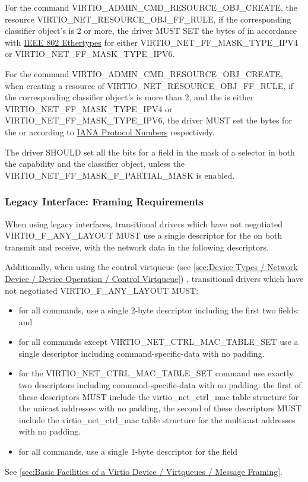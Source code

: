 For the command VIRTIO_ADMIN_CMD_RESOURCE_OBJ_CREATE, the resource 
VIRTIO_NET_RESOURCE_OBJ_FF_RULE, if the corresponding classifier object's
 is 2 or more, the driver MUST SET the  bytes of
 in accordance with
\hyperref[intro:IEEE 802 Ethertypes]{IEEE 802 Ethertypes}
for either VIRTIO_NET_FF_MASK_TYPE_IPV4 or VIRTIO_NET_FF_MASK_TYPE_IPV6.

For the command VIRTIO_ADMIN_CMD_RESOURCE_OBJ_CREATE, when creating a resource of
 VIRTIO_NET_RESOURCE_OBJ_FF_RULE, if the corresponding classifier
object's  is more than 2, and the  is either
VIRTIO_NET_FF_MASK_TYPE_IPV4 or VIRTIO_NET_FF_MASK_TYPE_IPV6, the driver MUST
set the  bytes for the  or 
according to \hyperref[intro:IANA Protocol Numbers]{IANA Protocol Numbers} respectively.

The driver SHOULD set all the bits for a field in the mask of a selector in both the
capability and the classifier object, unless the VIRTIO_NET_FF_MASK_F_PARTIAL_MASK
is enabled.

\subsubsection{Legacy Interface: Framing Requirements}\label{sec:Device
Types / Network Device / Legacy Interface: Framing Requirements}

When using legacy interfaces, transitional drivers which have not
negotiated VIRTIO_F_ANY_LAYOUT MUST use a single descriptor for the
 on both transmit and receive, with the
network data in the following descriptors.

Additionally, when using the control virtqueue (see \ref{sec:Device
Types / Network Device / Device Operation / Control Virtqueue})
, transitional drivers which have not
negotiated VIRTIO_F_ANY_LAYOUT MUST:
\begin{itemize}
\item for all commands, use a single 2-byte descriptor including the first two
fields:  and 
\item for all commands except VIRTIO_NET_CTRL_MAC_TABLE_SET
use a single descriptor including command-specific-data
with no padding.
\item for the VIRTIO_NET_CTRL_MAC_TABLE_SET command use exactly
two descriptors including command-specific-data with no padding:
the first of these descriptors MUST include the
virtio_net_ctrl_mac table structure for the unicast addresses with no padding,
the second of these descriptors MUST include the
virtio_net_ctrl_mac table structure for the multicast addresses
with no padding.
\item for all commands, use a single 1-byte descriptor for the
 field
\end{itemize}

See \ref{sec:Basic
Facilities of a Virtio Device / Virtqueues / Message Framing}.

